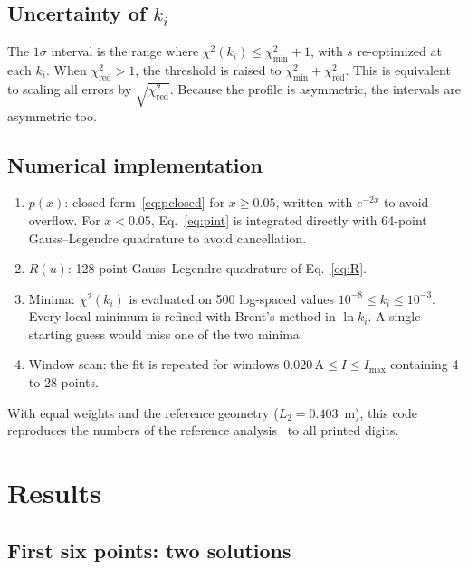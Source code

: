 \documentclass[11pt,a4paper]{article}
\newcommand{\kan}{k_i}
\begin{document}
\subsection{Uncertainty of $\kan$}
The $1\sigma$ interval is the range where $\chi^2(\kan)\le\chi^2_\text{min}+1$, with $s$ re-optimized at each $\kan$. When $\chi^2_\text{red}>1$, the threshold is raised to $\chi^2_\text{min}+\chi^2_\text{red}$. This is equivalent to scaling all errors by $\sqrt{\chi^2_\text{red}}$. Because the profile is asymmetric, the intervals are asymmetric too.

\subsection{Numerical implementation}
\begin{enumerate}
\item $p(x)$: closed form~\eqref{eq:pclosed} for $x\ge0.05$, written with $e^{-2x}$ to avoid overflow. For $x<0.05$, Eq.~\eqref{eq:pint} is integrated directly with 64-point Gauss--Legendre quadrature to avoid cancellation.
\item $R(u)$: 128-point Gauss--Legendre quadrature of Eq.~\eqref{eq:R}.
\item Minima: $\chi^2(\kan)$ is evaluated on 500 log-spaced values $10^{-8}\le\kan\le10^{-3}$. Every local minimum is refined with Brent's method in $\ln\kan$. A single starting guess would miss one of the two minima.
\item Window scan: the fit is repeated for windows $0.020\,\text{A}\le I\le I_\text{max}$ containing 4 to 28 points.
\end{enumerate}
With equal weights and the reference geometry ($L_2 = 0.403$~m), this code reproduces the numbers of the reference analysis~\cite{wang2026} to all printed digits.

\section{Results}

\subsection{First six points: two solutions}
\label{sec:twominima}
\end{document}
